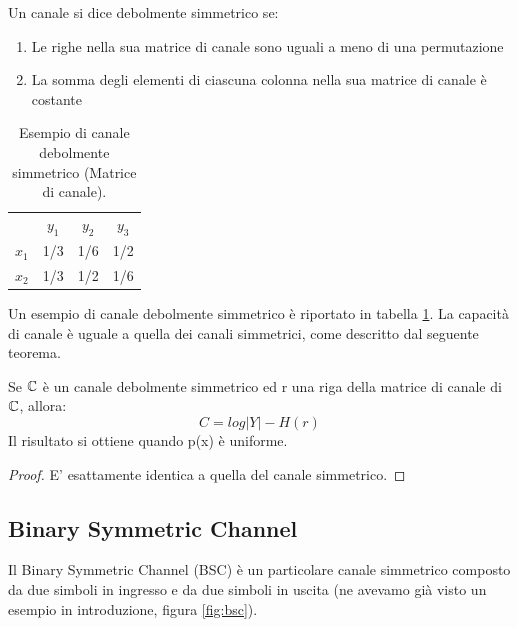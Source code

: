 \medskip

\begin{definizione}
 Un canale si dice debolmente simmetrico se:
 \begin{enumerate}
  \item Le righe nella sua matrice di canale sono uguali a meno di una permutazione
  \item La somma degli elementi di ciascuna colonna nella sua matrice di canale è costante
 \end{enumerate}
\end{definizione}

\begin{table}[htbp]
  \begin{center}
   \begin{tabular}{c c c c}
	  & $y_1$ & $y_2$ & $y_3$ \\
	$x_1$ & 1/3 & 1/6 & 1/2 \\ 
	$x_2$ & 1/3 & 1/2 & 1/6  \\ 
    \end{tabular}
  \end{center}
  \label{tdsim}
  \caption{Esempio di canale debolmente simmetrico (Matrice di canale).}
\end{table}

\noindent
Un esempio di canale debolmente simmetrico è riportato in tabella \ref{tdsim}.
La capacità di canale è uguale a quella dei canali simmetrici, come descritto dal seguente teorema.

\begin{teorema}
 Se $\mathbb{C}$ è un canale debolmente simmetrico ed r una riga della matrice di canale di $\mathbb{C}$, allora:
 \[
  C=log|Y| - H(r)
 \]
 Il risultato si ottiene quando p(x) è uniforme.
\begin{proof}
 E' esattamente identica a quella del canale simmetrico.
\end{proof}

\end{teorema}

\subsection{Binary Symmetric Channel}

Il Binary Symmetric Channel (BSC) è un particolare canale simmetrico composto da due simboli in ingresso e da due simboli in uscita (ne avevamo già visto un esempio in introduzione, figura \ref{fig:bsc}).

